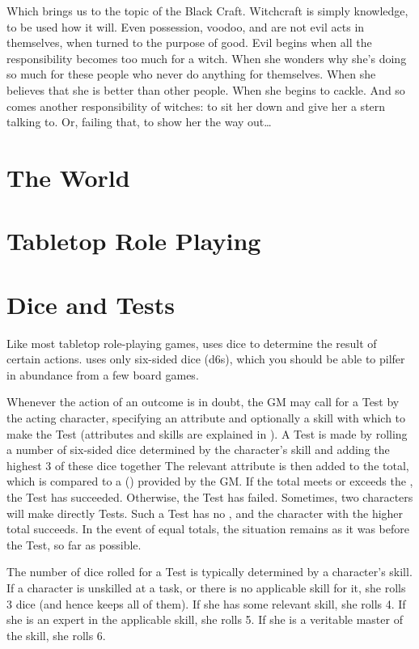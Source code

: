 Which brings us to the topic of the Black Craft.
Witchcraft is simply knowledge, to be used how it will.
Even possession, voodoo, and  are not evil acts in themselves, when turned to the purpose of good. %
Evil begins when all the responsibility becomes too much for a witch.
When she wonders why she's doing so much for these people who never do anything for themselves.
When she believes that she is better than other people.
When she begins to cackle.
And so comes another responsibility of witches: to sit her down and give her a stern talking to.
Or, failing that, to show her the way out{\dots}

\section{The World}


\section{Tabletop Role Playing}

\section{Dice and Tests}

Like most tabletop role-playing games,  uses dice to determine the result of certain actions.
 uses only six-sided dice (d6s), which you should be able to pilfer in abundance from a few board games.

Whenever the action of an outcome is in doubt, the GM may call for a Test by the acting character, specifying an attribute and optionally a skill with which to make the Test (attributes and skills are explained in ).
A Test is made by rolling a number of six-sided dice determined by the character's skill and adding the highest 3 of these dice together
The relevant attribute is then added to the total, which is compared to a {\targetnumber} ({\tn}) provided by the GM.
If the total meets or exceeds the {\tn}, the Test has succeeded.
Otherwise, the Test has failed.
Sometimes, two characters will make directly {\opposed} Tests.
Such a Test has no {\tn}, and the character with the higher total succeeds.
In the event of equal totals, the situation remains as it was before the Test, so far as possible.

The number of dice rolled for a Test is typically determined by a character's skill.
If a character is unskilled at a task, or there is no applicable skill for it, she rolls 3 dice (and hence keeps all of them).
If she has some relevant skill, she rolls 4.
If she is an expert in the applicable skill, she rolls 5.
If she is a veritable master of the skill, she rolls 6.

